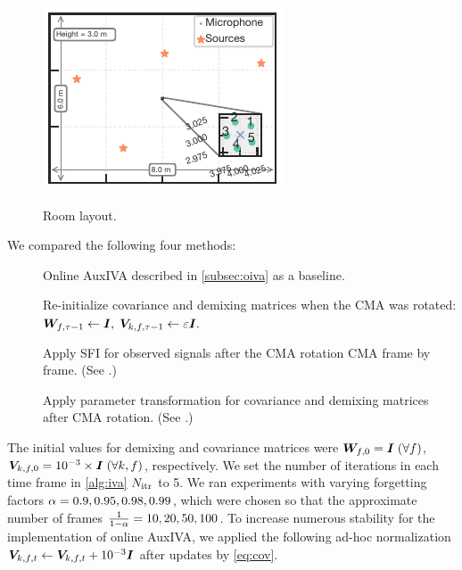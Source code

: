 \documentclass[sip,biber]{now-journal}
\begin{document}
\begin{figure}[t]
  \begin{minipage}[t]{.32\linewidth}
    \centering
    \includegraphics[width=\columnwidth]{figures/room_layout_040.pdf}
    \label{fig:layout:rot}
  \end{minipage}
  \caption{Room layout.}%
  \label{fig:layout:exp}
\end{figure}

We compared the following four methods:
\begin{description}
  \item[\NaiveIVA] Online AuxIVA described in \cref{subsec:oiva} as a baseline.
  \item[\ResetIVA] Re-initialize covariance and demixing matrices when the CMA was rotated:
      $\bm{W} _{f,\tau - 1} \gets \bm{I}, \; \bm{V} _{k,f,\tau - 1} \gets \varepsilon \bm{I}.$
  \item[\SFIIVAo] Apply SFI for observed signals after the CMA rotation CMA frame by frame. (See .)
  \item[\SFIIVAm] Apply parameter transformation for covariance and demixing matrices after CMA rotation.  (See .)
\end{description}
The initial values for demixing and covariance matrices were
$\bm{W} _{f,0} = \bm{I}\; (\forall f)$, $\bm{V} _{k,f,0} = 10^{-3}\times\bm{I}\; (\forall k, f)$, respectively.
We set the number of iterations in each time frame in \cref{alg:iva} $N _{\mathrm{itr}}$ to 5.
We ran experiments with varying forgetting factors $\alpha = 0.9, 0.95, 0.98, 0.99$, which were chosen so that the approximate number of frames $\frac{1}{1 - \alpha} = 10, 20, 50, 100$.
To increase numerous stability for the implementation of online AuxIVA,
we applied the following ad-hoc normalization $\cov _{\src,\ft} \gets \cov _{\src,\ft} + 10 ^{-3} \Eye$ after updates by \eqref{eq:cov}.
\end{document}
